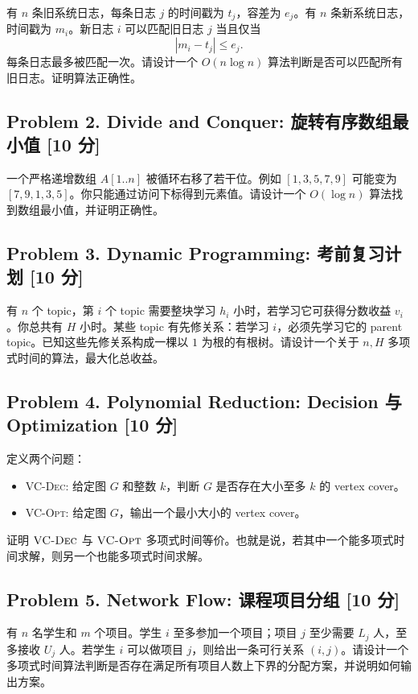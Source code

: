 \documentclass[UTF8,a4paper,11pt]{ctexart}
\newcommand{\points}[1]{\hfill{\small\textbf{[#1 分]}}}
\begin{document}
有 $n$ 条旧系统日志，每条日志 $j$ 的时间戳为 $t_j$，容差为 $e_j$。有 $n$ 条新系统日志，时间戳为 $m_i$。新日志 $i$ 可以匹配旧日志 $j$ 当且仅当
\[
|m_i-t_j|\le e_j.
\]
每条日志最多被匹配一次。请设计一个 $O(n\log n)$ 算法判断是否可以匹配所有旧日志。证明算法正确性。

\subsection*{Problem 2. Divide and Conquer: 旋转有序数组最小值 \points{10}}

一个严格递增数组 $A[1..n]$ 被循环右移了若干位。例如 $[1,3,5,7,9]$ 可能变为 $[7,9,1,3,5]$。你只能通过访问下标得到元素值。请设计一个 $O(\log n)$ 算法找到数组最小值，并证明正确性。

\subsection*{Problem 3. Dynamic Programming: 考前复习计划 \points{10}}

有 $n$ 个 topic，第 $i$ 个 topic 需要整块学习 $h_i$ 小时，若学习它可获得分数收益 $v_i$。你总共有 $H$ 小时。某些 topic 有先修关系：若学习 $i$，必须先学习它的 parent topic。已知这些先修关系构成一棵以 $1$ 为根的有根树。请设计一个关于 $n,H$ 多项式时间的算法，最大化总收益。

\subsection*{Problem 4. Polynomial Reduction: Decision 与 Optimization \points{10}}

定义两个问题：
\begin{itemize}
  \item \textsc{VC-Dec}: 给定图 $G$ 和整数 $k$，判断 $G$ 是否存在大小至多 $k$ 的 vertex cover。
  \item \textsc{VC-Opt}: 给定图 $G$，输出一个最小大小的 vertex cover。
\end{itemize}
证明 $\textsc{VC-Dec}$ 与 $\textsc{VC-Opt}$ 多项式时间等价。也就是说，若其中一个能多项式时间求解，则另一个也能多项式时间求解。

\subsection*{Problem 5. Network Flow: 课程项目分组 \points{10}}

有 $n$ 名学生和 $m$ 个项目。学生 $i$ 至多参加一个项目；项目 $j$ 至少需要 $L_j$ 人，至多接收 $U_j$ 人。若学生 $i$ 可以做项目 $j$，则给出一条可行关系 $(i,j)$。请设计一个多项式时间算法判断是否存在满足所有项目人数上下界的分配方案，并说明如何输出方案。
\end{document}
